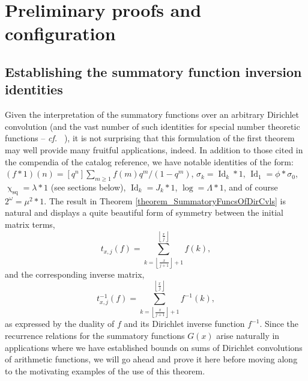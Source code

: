 \documentclass[11pt,reqno,a4letter]{article}
\numberwithin{figure}{section}
\numberwithin{table}{section}
\newcommand{\cf}{\textit{cf.\ }}
\newcommand{\floor}[1]{\left\lfloor #1 \right\rfloor}
\renewcommand{\chi}{\upchi}
\theoremstyle{plain}
\numberwithin{theorem}{section}
\theoremstyle{definition}
\begin{document}
\newpage 
\section{Preliminary proofs and configuration} 
\label{Section_PrelimProofs_Config} 

\subsection{Establishing the summatory function inversion identities} 

Given the interpretation of the summatory functions over an arbitrary Dirichlet convolution 
(and the vast number of such identities for special number theoretic functions -- \cf 
\cite{CATALOG-INTDIRSERIES,CATALOG-LAMBERTSERIES}), it is not surprising that this formulation of the first theorem 
may well provide many fruitful applications, indeed. In addition to those cited in the 
compendia of the catalog reference, we have notable identities of the form: 
$(f \ast 1)(n) = [q^n] \sum_{m \geq 1} f(m) q^m / (1-q^m)$, 
$\sigma_k = \operatorname{Id}_k \ast 1$, $\operatorname{Id}_1 = \phi \ast \sigma_0$, 
$\chi_{\operatorname{sq}} = \lambda \ast 1$ (see sections below), 
$\operatorname{Id}_k = J_k \ast 1$, $\log = \Lambda \ast 1$, and of course 
$2^{\omega} = \mu^2 \ast 1$. 
The result in Theorem \ref{theorem_SummatoryFuncsOfDirCvls} is 
natural and displays a quite beautiful form of symmetry between the 
initial matrix terms, $$t_{x,j}(f) = \sum_{k=\floor{\frac{x}{j+1}}+1}^{\floor{\frac{x}{j}}} f(k),$$ and the 
corresponding inverse matrix, $$t_{x,j}^{-1}(f) = \sum_{k=\floor{\frac{x}{j+1}}+1}^{\floor{\frac{x}{j}}} f^{-1}(k),$$ 
as expressed by the duality of $f$ and its Dirichlet inverse function $f^{-1}$. Since the recurrence relations for the 
summatory functions $G(x)$ arise naturally in applications where we have established bounds on sums of 
Dirichlet convolutions of arithmetic functions, we will go ahead and prove it here before moving along to the 
motivating examples of the use of this theorem. 
\end{document}
